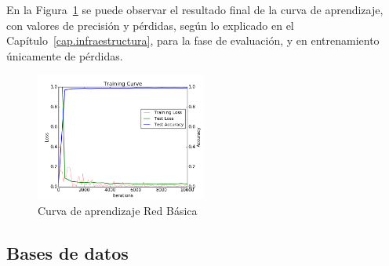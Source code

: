\begin{description}
	En la Figura~\ref{fig.Log} se puede observar el resultado final de la curva de aprendizaje, con valores de precisión y pérdidas, según lo explicado en el Capítulo~\ref{cap.infraestructura}, para la fase de evaluación, y en entrenamiento únicamente de pérdidas.
	
	\begin{figure}[h!]
		\begin{center}
			\includegraphics[width=0.5\textwidth]{figures/RedBasicaLog}
			\caption{Curva de aprendizaje Red Básica}
			\label{fig.Log}
		\end{center}
	\end{figure}
\end{description}
\subsection{Bases de datos}

